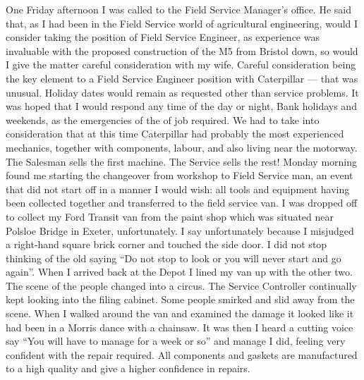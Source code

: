 One Friday afternoon I was called to the Field Service Manager's office. He said
that, as I had been in the Field Service world of agricultural engineering,
would I consider taking the position of Field Service Engineer, as experience
was invaluable with the proposed construction of the M5 from Bristol down, so
would I give the matter careful consideration with my wife. Careful
consideration being the key element to a Field Service Engineer position with
Caterpillar --- that was unusual. Holiday dates would remain as requested other
than service problems. It was hoped that I would respond any time of the day or
night, Bank holidays and weekends, as the emergencies of the of job required.
We had to take into consideration that at this time Caterpillar had probably
the most experienced mechanics, together with components, labour, and also
living near the motorway. The Salesman sells the first machine. The Service
sells the rest! Monday morning found me starting the changeover from workshop
to Field Service man, an event that did not start off in a manner I would wish:
all tools and equipment having been collected together and transferred to the
field service van. I was dropped off to collect my Ford Transit van from the
paint shop which was situated near Polsloe Bridge in Exeter, unfortunately. I
say unfortunately because I misjudged a right-hand square brick corner and
touched the side door. I did not stop thinking of the old saying ``Do not stop
to look or you will never start and go again''. When I arrived back at the
Depot I lined my van up with the other two. The scene of the people changed
into a circus. The Service Controller continually kept looking into the filing
cabinet. Some people smirked and slid away from the scene. When I walked around
the van and examined the damage it looked like it had been in a Morris dance
with a chainsaw. It was then I heard a cutting voice say ``You will have to
manage for a week or so'' and manage I did, feeling very confident with the
repair required. All components and gaskets are manufactured to a high quality
and give a higher confidence in repairs.

